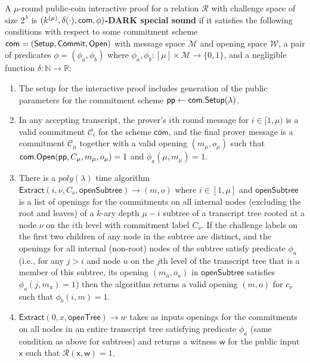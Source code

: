 \begin{definition}\label{def:darkspecialsoundness} A $\mu$-round public-coin interactive proof for a relation $\mathcal{R}$ with challenge space of size $2^\lambda$ is \textbf{$(k^{(\mu)}, \delta(\cdot), \mathsf{com}, \phi)$-DARK special sound} if it satisfies the following conditions with respect to some commitment scheme $\mathsf{com} = (\textsf{{Setup}},\textsf{{Commit}}, \textsf{{Open}})$ with message space $\mathcal{M}$ and opening space $\mathcal{W}$, a pair of predicates $\phi = (\phi_a, \phi_b)$ where $\phi_a, \phi_b:[\mu] \times \mathcal{M}  \rightarrow \{0,1\}$, and a negligible function $\delta: \mathbb{N} \rightarrow \mathbb{R}$:

\begin{enumerate} 
\item The setup for the interactive proof includes generation of the public parameters for the commitment scheme $\textsf{pp} \gets \textsf{com}.\textsf{{Setup}}(\lambda)$.  
\item  In any accepting transcript, the prover's $i$th round message for $i \in [1,\mu)$ is a valid commitment $\mathcal{C}_i$ for the scheme $\mathsf{com}$, and the final prover message is a commitment $\mathcal{C}_\mu$ together with a valid opening $(m_\mu, o_\mu)$ such that $\textsf{com}.\textsf{{Open}}(\textsf{pp},C_\mu, m_\mu, o_\mu) = 1$ and $\phi_a(\mu, m_\mu) = 1$. 


\item  There is a $poly(\lambda)$ time algorithm $\textsf{Extract}(i, \nu, C_\nu, \textsf{openSubtree}) \rightarrow (m, o)$ where $i \in [1,\mu]$ and $\textsf{openSubtree}$ is a list of openings for the commitments on all internal nodes (excluding the root and leaves) of a $k$-ary depth $\mu - i$ subtree of a transcript tree rooted at a node $\nu$ on the $i$th level with commitment label $C_\nu$. If the challenge labels on the first two children of any node in the subtree are distinct, and the openings for all internal (non-root) nodes of the subtree satisfy predicate $\phi_a$ (i.e., for any $j > i$ and node $u$ on the $j$th level of the transcript tree that is a member of this subtree, its opening $(m_u, o_u)$ in $\textsf{openSubtree}$ satisfies $\phi_a(j, m_u)= 1$) then the algorithm returns a valid opening $(m,o)$ for $c_\nu$ such that $\phi_b(i, m) = 1$.  

\item  $\textsf{Extract}(0,x,\textsf{openTree}) \rightarrow w$ takes as inputs openings for the commitments on all nodes in an entire transcript tree satisfying predicate $\phi_a$ (same condition as above for subtrees) and returns a witness $\mathsf{w}$ for the public input $\mathsf{x}$ such that $\mathcal{R}(\mathsf{x},\mathsf{w})=1$. 


\end{enumerate}
\end{definition}
